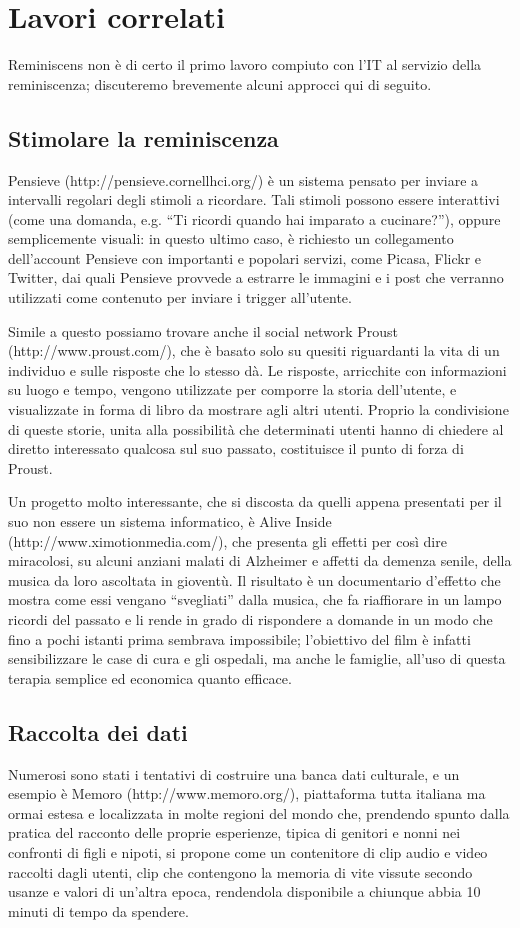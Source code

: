 \documentclass[sigproc-sp.tex]{subfiles}
\begin{document}
\section{Lavori correlati}
Reminiscens non è di certo il primo lavoro compiuto con l’IT al servizio della reminiscenza; discuteremo brevemente alcuni approcci qui di seguito.

\subsection{Stimolare la reminiscenza}
Pensieve (http://pensieve.cornellhci.org/) è un sistema pensato per inviare a intervalli regolari degli stimoli a ricordare. Tali stimoli possono essere interattivi (come una domanda, e.g. “Ti ricordi quando hai imparato a cucinare?”), oppure semplicemente visuali: in questo ultimo caso, è richiesto un collegamento dell’account Pensieve con importanti e popolari servizi, come Picasa, Flickr e Twitter, dai quali Pensieve provvede a estrarre le immagini e i post che verranno utilizzati come contenuto per inviare i trigger all’utente.

Simile a questo possiamo trovare anche il social network Proust (http://www.proust.com/), che è basato solo su quesiti riguardanti la vita di un individuo e sulle risposte che lo stesso dà. Le risposte, arricchite con informazioni su luogo e tempo, vengono utilizzate per comporre la storia dell’utente, e visualizzate in forma di libro da mostrare agli altri utenti. Proprio la condivisione di queste storie, unita alla possibilità che determinati utenti hanno di chiedere al diretto interessato qualcosa sul suo passato, costituisce il punto di forza di Proust.

Un progetto molto interessante, che si discosta da quelli appena presentati per il suo non essere un sistema informatico, è Alive Inside (http://www.ximotionmedia.com/), che presenta gli effetti per così dire miracolosi, su alcuni anziani malati di Alzheimer e affetti da demenza senile, della musica da loro ascoltata in gioventù. Il risultato è un documentario d’effetto che mostra come essi vengano “svegliati” dalla musica, che fa riaffiorare in un lampo ricordi del passato e li rende in grado di rispondere a domande in un modo che fino a pochi istanti prima sembrava impossibile; l’obiettivo del film è infatti sensibilizzare le case di cura e gli ospedali, ma anche le famiglie, all’uso di questa terapia semplice ed economica quanto efficace.

\subsection{Raccolta dei dati}
Numerosi sono stati i tentativi di costruire una banca dati culturale, e un esempio è Memoro (http://www.memoro.org/), piattaforma tutta italiana ma ormai estesa e localizzata in molte regioni del mondo che, prendendo spunto dalla pratica del racconto delle proprie esperienze, tipica di genitori e nonni nei confronti di figli e nipoti, si propone come un contenitore di clip audio e video raccolti dagli utenti, clip che contengono la memoria di vite vissute secondo usanze e valori di un'altra epoca, rendendola disponibile a chiunque abbia 10 minuti di tempo da spendere.
\end{document}
